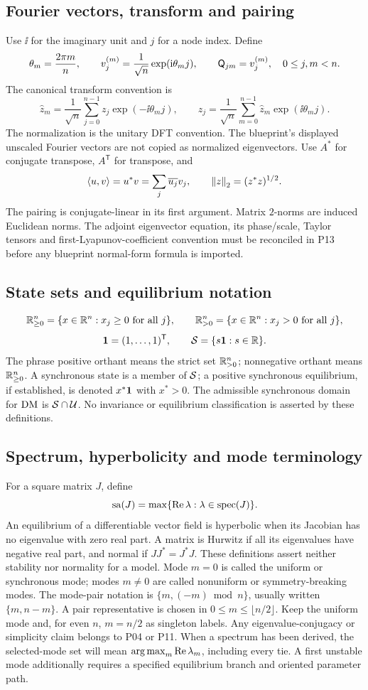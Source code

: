 \subsection{Fourier vectors, transform and pairing}
Use $\ii$ for the imaginary unit and $j$ for a node index. Define
\[
\theta_m=\frac{2\pi m}{n},\qquad
v^{(m)}_j=\frac{1}{\sqrt n}\exp(\mathrm{i}\theta_m j),\qquad
\mathsf{Q}_{jm}=v^{(m)}_j,\quad 0\leq j,m<n.
\]
The canonical transform convention is
\[
\widehat z_m=\frac{1}{\sqrt n}\sum_{j=0}^{n-1}
    z_j\exp(-\ii\theta_m j),\qquad
z_j=\frac{1}{\sqrt n}\sum_{m=0}^{n-1}
    \widehat z_m\exp(\ii\theta_m j).
\]
The normalization is the unitary DFT convention. The blueprint's displayed
unscaled Fourier vectors are not copied as normalized eigenvectors.
Use $A^*$ for conjugate transpose, $A^{\mathsf T}$ for transpose, and
\[
\langle u,v\rangle=u^*v=\sum_j\overline{u_j}v_j,
\qquad \left\lVert z\right\rVert_2=(z^*z)^{1/2}.
\]
The pairing is conjugate-linear in its first argument. Matrix $2$-norms are
induced Euclidean norms. The adjoint eigenvector equation, its phase/scale,
Taylor tensors and first-Lyapunov-coefficient convention must be reconciled
in P13 before any blueprint normal-form formula is imported.

\subsection{State sets and equilibrium notation}
\[
\mathbb{R}_{\geq 0}^{n}=\{x\in\mathbb{R}^n:x_j\geq0\ \text{for all }j\},\qquad
\mathbb{R}_{>0}^{n}=\{x\in\mathbb{R}^n:x_j>0\ \text{for all }j\},
\]
\[
\mathbf{1}=(1,\ldots,1)^{\mathsf T},\qquad
\mathcal{S}=\{s\mathbf{1}:s\in\mathbb{R}\}.
\]
The phrase positive orthant means the strict set $\mathbb{R}_{>0}^{n}$; nonnegative
orthant means $\mathbb{R}_{\geq 0}^{n}$. A synchronous state is a member of $\mathcal{S}$; a positive
synchronous equilibrium, if established, is denoted $x^*\mathbf{1}$ with $x^*>0$.
The admissible synchronous domain for $\mathrm{DM}$ is $\mathcal{S}\cap\mathcal{U}$.
No invariance or equilibrium classification is asserted by these definitions.

\subsection{Spectrum, hyperbolicity and mode terminology}
For a square matrix $J$, define
\[
\operatorname{sa}(J)=\max\{\operatorname{Re}\lambda:\lambda\in\operatorname{spec}(J)\}.
\]
An equilibrium of a differentiable vector field is hyperbolic when its
Jacobian has no eigenvalue with zero real part. A matrix is Hurwitz if all
its eigenvalues have negative real part, and normal if $JJ^*=J^*J$.
These definitions assert neither stability nor normality for a model.
Mode $m=0$ is called the uniform or synchronous mode; modes $m\neq0$ are
called nonuniform or symmetry-breaking modes. The mode-pair notation is
$\{m,(-m)\bmod n\}$, usually written $\{m,n-m\}$. A pair representative is
chosen in $0\leq m\leq\lfloor n/2\rfloor$. Keep the uniform mode and, for
even $n$, $m=n/2$ as singleton labels. Any eigenvalue-conjugacy or simplicity
claim belongs to P04 or P11.
When a spectrum has been derived, the selected-mode set will mean
$\operatorname*{arg\,max}_m\operatorname{Re}\lambda_m$, including every tie. A first unstable mode additionally
requires a specified equilibrium branch and oriented parameter path.

